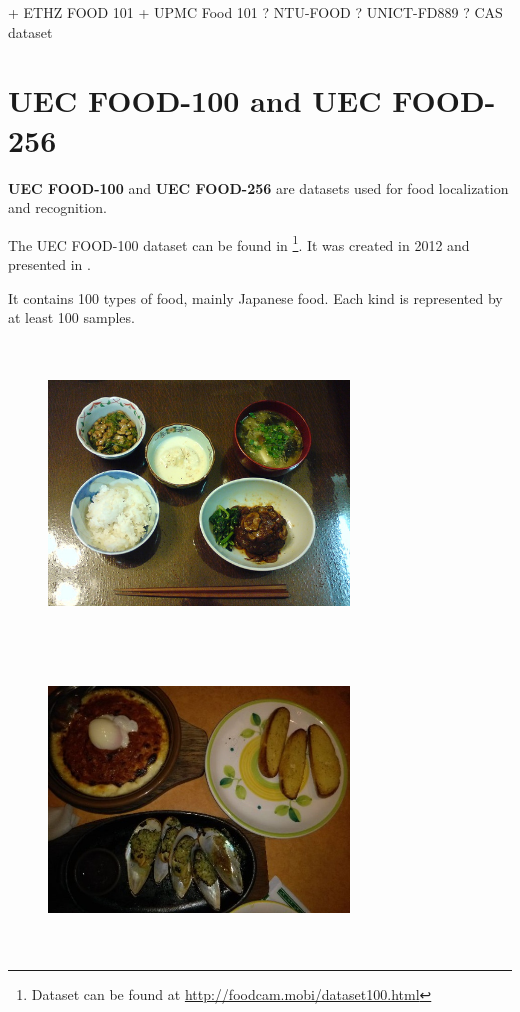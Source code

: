 + ETHZ FOOD 101
+ UPMC Food 101
? NTU-FOOD
? UNICT-FD889
? CAS dataset

\section{UEC FOOD-100 and UEC FOOD-256}

\textbf{UEC FOOD-100} and \textbf{UEC FOOD-256} are datasets used for food localization and recognition.

The UEC FOOD-100 dataset can be found in \footnote{Dataset can be found at \url{http://foodcam.mobi/dataset100.html}}. It was created in 2012 and presented in \cite{Matsuda2012a}.

It contains 100 types of food, mainly Japanese food. Each kind is represented by at least 100 samples.

\begin{figure}[h]
    \includegraphics[width=8cm, height=8cm]{img/multiple_food_items_1}
    \includegraphics[width=8cm, height=8cm]{img/multiple_food_items_2}

\end{figure}
